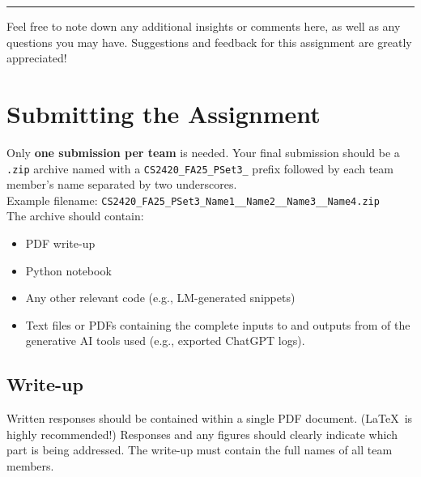\documentclass[a4 paper]{article}
\numberwithin{equation}{section}
\newcommand{\solution}{~\newline\textbf{\textit{(Solution)}} }
\begin{document}
\noindent\rule{\textwidth}{1pt}

Feel free to note down any additional insights or comments here, as well as any questions you may have.
Suggestions and feedback for this assignment are greatly appreciated!


\newpage
\section*{Submitting the Assignment}

Only \textbf{one submission per team} is needed.
Your final submission should be a \texttt{.zip} archive named with a \texttt{CS2420\_FA25\_PSet3\_} prefix followed by each team member's name separated by two underscores.\\

\noindent
Example filename: \texttt{CS2420\_FA25\_PSet3\_Name1\_\_Name2\_\_Name3\_\_Name4.zip}\\


\noindent
The archive should contain:
\begin{itemize}
    \item PDF write-up
    \item Python notebook
    \item Any other relevant code (e.g., LM-generated snippets)
    \item Text files or PDFs containing the complete inputs to and outputs from of the generative AI tools used (e.g., exported ChatGPT logs).
\end{itemize}

\subsection*{Write-up}
Written responses should be contained within a single PDF document.
(\LaTeX~is highly recommended!)
Responses and any figures should clearly indicate which part is being addressed.
The write-up must contain the full names of all team members.

\end{document}
